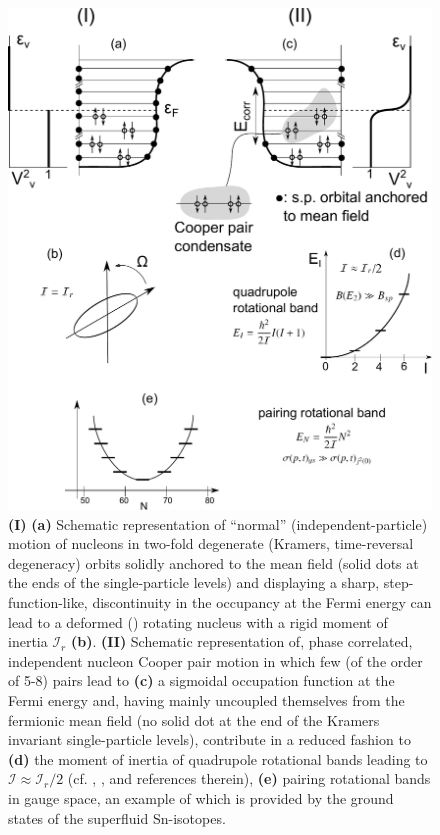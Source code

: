  
\begin{figure}
\centerline{\includegraphics*[width=\textwidth,angle=0]{nutshell/figs/fig1A3.pdf}}
\caption[Independent particle motion vs. independent pair motion.]{\textbf{(I)} \textbf{(a)} Schematic representation of ``normal'' (independent-particle) motion of nucleons in  two-fold degenerate (Kramers, time-reversal degeneracy) orbits solidly anchored to the mean field (solid dots at the ends of the single-particle levels) and  displaying a sharp, step-function-like, discontinuity in the occupancy at the Fermi energy can lead to a deformed  (\cite{Nilsson:55}) rotating nucleus with a rigid moment of inertia $\mathcal{I}_r$ \textbf{(b)}. \textbf{(II)} Schematic representation of, phase correlated, independent nucleon Cooper pair  motion in which few (of the order of 5-8) pairs lead to \textbf{(c)} a sigmoidal occupation function at the Fermi energy and, having mainly uncoupled themselves from the fermionic mean field (no solid dot at the end of the Kramers invariant single-particle levels),    contribute in a reduced fashion to \textbf{(d)} the moment of inertia of quadrupole rotational bands leading to $\mathcal{I}\approx\mathcal{I}_r/2$ (cf. \cite{Belyaev:13}, \cite{Belyaev:59}, \cite{Bohr:75} and references therein), \textbf{(e)} pairing rotational bands in gauge space, an example of which is  provided by the ground states of the superfluid Sn-isotopes.}\label{fig1A3}
\end{figure}
\FloatBarrier

